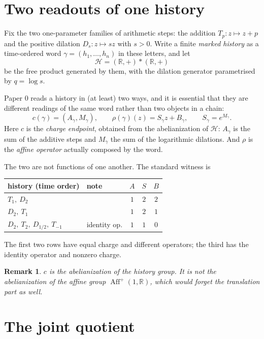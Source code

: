 \documentclass[11pt]{article}
\newtheorem{remark}[theorem]{Remark}
\begin{document}
\section{Two readouts of one history}
\label{sec:readouts}

Fix the two one-parameter families of arithmetic steps: the addition
$T_p:z\mapsto z+p$ and the positive dilation $D_s:z\mapsto sz$ with $s>0$. Write a
finite \emph{marked history} as a time-ordered word
$\gamma=(h_1,\dots,h_n)$ in these letters, and let
\[
\mathcal H=(\mathbb R,+)*(\mathbb R,+)
\]
be the free product generated by them, with the dilation generator parametrised by
$q=\log s$.

Paper 0 reads a history in (at least) two ways, and it is essential that they are
different readings of the same word rather than two objects in a chain:
\[
c(\gamma)=(A_\gamma,M_\gamma),
\qquad
\rho(\gamma)(z)=S_\gamma z+B_\gamma,\qquad S_\gamma=e^{M_\gamma}.
\]
Here $c$ is the \emph{charge endpoint}, obtained from the abelianization of
$\mathcal H$: $A_\gamma$ is the sum of the additive steps and $M_\gamma$ the sum
of the logarithmic dilations. And $\rho$ is the \emph{affine operator} actually
composed by the word.

The two are not functions of one another. The standard witness is
\begin{center}
\small
\begin{tabular}{@{}llccc@{}}
\toprule
history (time order) & note & $A$ & $S$ & $B$\\
\midrule
$T_1,\ D_2$                    &              & $1$ & $2$ & $2$\\
$D_2,\ T_1$                    &              & $1$ & $2$ & $1$\\
$D_2,\ T_2,\ D_{1/2},\ T_{-1}$ & identity op. & $1$ & $1$ & $0$\\
\bottomrule
\end{tabular}
\end{center}
The first two rows have equal charge and different operators; the third has the
identity operator and nonzero charge.

\begin{remark}
$c$ is the abelianization of the \emph{history} group. It is not the
abelianization of the affine group $\operatorname{Aff}^+(1,\mathbb R)$, which
would forget the translation part as well.
\end{remark}

\section{The joint quotient}
\label{sec:group}
\end{document}

